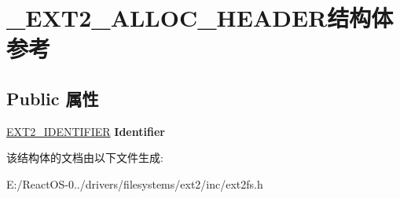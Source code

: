 \hypertarget{struct___e_x_t2___a_l_l_o_c___h_e_a_d_e_r}{}\section{\+\_\+\+E\+X\+T2\+\_\+\+A\+L\+L\+O\+C\+\_\+\+H\+E\+A\+D\+E\+R结构体 参考}
\label{struct___e_x_t2___a_l_l_o_c___h_e_a_d_e_r}
\subsection*{Public 属性}
\begin{DoxyCompactItemize}
\item 
\mbox{\label{struct___e_x_t2___a_l_l_o_c___h_e_a_d_e_r_a9d2c3b7ea9356ae8cdce4a209e25b05a}} 
\hyperlink{struct___e_x_t2___i_d_e_n_t_i_f_i_e_r}{E\+X\+T2\+\_\+\+I\+D\+E\+N\+T\+I\+F\+I\+ER} {\bfseries Identifier}
\end{DoxyCompactItemize}


该结构体的文档由以下文件生成\+:\begin{DoxyCompactItemize}
\item 
E\+:/\+React\+O\+S-\/0../drivers/filesystems/ext2/inc/ext2fs.\+h\end{DoxyCompactItemize}
